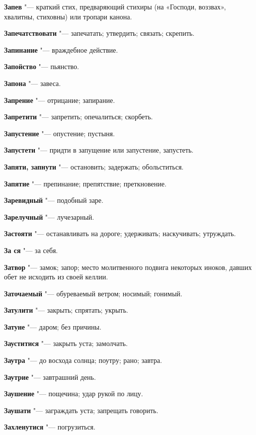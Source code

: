 \begin{mymulticols}
\noindent\textbf{Запев} "--- краткий стих, предваряющий стихиры (на «Господи, воззвах», хвалитны, стиховны) или тропари канона. 

\noindent\textbf{Запечатствовати} "--- запечатать; утвердить; связать; скрепить. 

\noindent\textbf{Запинание} "--- враждебное действие. 

\noindent\textbf{Запойство} "--- пьянство. 

\noindent\textbf{Запона} "--- завеса. 

\noindent\textbf{Запрение} "--- отрицание; запирание. 

\noindent\textbf{Запретити} "--- запретить; опечалиться; скорбеть. 

\noindent\textbf{Запустение} "--- опустение; пустыня. 

\noindent\textbf{Запустети} "--- придти в запущение или запустение, запустеть. 

\noindent\textbf{Запяти, запнути} "--- остановить; задержать; обольститься. 

\noindent\textbf{Запятие} "--- препинание; препятствие; преткновение. 

\noindent\textbf{Заревидный} "--- подобный заре. 

\noindent\textbf{Зарелучный} "--- лучезарный. 

\noindent\textbf{Застояти} "--- останавливать на дороге; удерживать; наскучивать; утруждать. 

\noindent\textbf{За ся} "--- за себя. 

\noindent\textbf{Затвор} "--- замок; запор; место молитвенного подвига некоторых иноков, давших обет не исходить из своей келлии. 

\noindent\textbf{Заточаемый} "--- обуреваемый ветром; носимый; гонимый. 

\noindent\textbf{Затулити} "--- закрыть; спрятать; укрыть. 

\noindent\textbf{Затуне} "--- даром; без причины. 

\noindent\textbf{Зауститися} "--- закрыть уста; замолчать. 

\noindent\textbf{Заутра} "--- до восхода солнца; поутру; рано; завтра. 

\noindent\textbf{Заутрие} "--- завтрашний день. 

\noindent\textbf{Заушение} "--- пощечина; удар рукой по лицу. 

\noindent\textbf{Заушати} "--- заграждать уста; запрещать говорить. 

\noindent\textbf{Захленутися} "--- погрузиться. 


\end{mymulticols}
